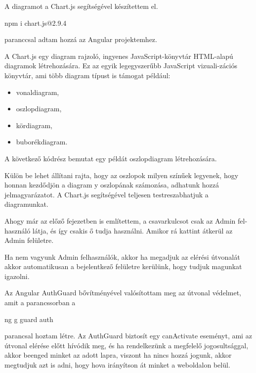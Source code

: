 A diagramot a Chart.js \cite{Chartjs} segítségével készítettem el. 
\begin{java}
npm i chart.js@2.9.4
\end{java}
paranccsal adtam hozzá az Angular projektemhez.

A Chart.js \cite{Chartjs2} egy diagram rajzoló, ingyenes JavaScript-könyvtár HTML-alapú diagramok létrehozására. Ez az egyik legegyszerűbb JavaScript vizuali-zációs könyvtár, ami több diagram típust is támogat például:

\begin{itemize}
\item vonaldiagram,
\item oszlopdiagram,
\item kördiagram,
\item buborékdiagram.
\end{itemize}

A következő kódrész bemutat egy példát oszlopdiagram létrehozására.

Külön be lehet állítani rajta, hogy az oszlopok milyen színűek legyenek, hogy honnan kezdődjön a diagram y oszlopának számozása, adhatunk hozzá jelmagyarázatot. A Chart.js segítségével teljesen testreszabhatjuk a diagramunkat.

Ahogy már az előző fejezetben is említettem, a csavarkulcsot csak az Admin fel-
használó látja, és így csakis ő tudja használni. Amikor rá kattint átkerül az Admin felületre.

Ha nem vagyunk Admin felhasználók, akkor ha megadjuk az elérési útvonalát akkor automatikusan a bejelentkező felületre kerülünk, hogy tudjuk magunkat igazolni.

Az Angular AuthGuard bővítményével valósítottam meg az útvonal védelmet, amit a parancssorban a 
\begin{java}
ng g guard auth
\end{java}
parancsal hoztam létre.
Az AuthGuard biztosít egy canActivate eseményt, ami az útvonal elérése előtt hívódik meg, és ha rendelkezünk a megfelelő jogosultsággal, akkor beenged minket az adott lapra, viszont ha nincs hozzá jogunk, akkor megtudjuk azt is adni, hogy hova irányítson át minket a weboldalon belül.


